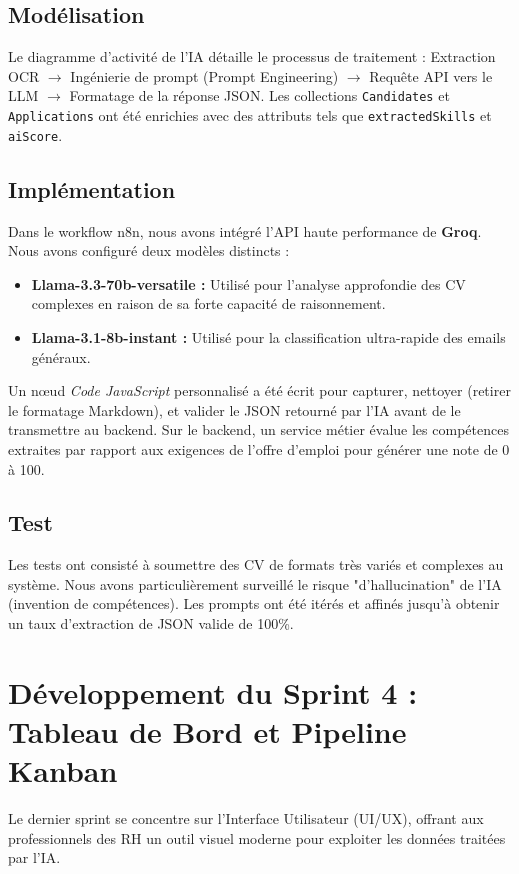 \subsection{Modélisation}
Le diagramme d'activité de l'IA détaille le processus de traitement : Extraction OCR $\rightarrow$ Ingénierie de prompt (Prompt Engineering) $\rightarrow$ Requête API vers le LLM $\rightarrow$ Formatage de la réponse JSON. Les collections \texttt{Candidates} et \texttt{Applications} ont été enrichies avec des attributs tels que \texttt{extractedSkills} et \texttt{aiScore}.

\subsection{Implémentation}
Dans le workflow n8n, nous avons intégré l'API haute performance de \textbf{Groq}. Nous avons configuré deux modèles distincts : 
\begin{itemize}
    \item \textbf{Llama-3.3-70b-versatile :} Utilisé pour l'analyse approfondie des CV complexes en raison de sa forte capacité de raisonnement.
    \item \textbf{Llama-3.1-8b-instant :} Utilisé pour la classification ultra-rapide des emails généraux.
\end{itemize}
Un nœud \textit{Code JavaScript} personnalisé a été écrit pour capturer, nettoyer (retirer le formatage Markdown), et valider le JSON retourné par l'IA avant de le transmettre au backend. Sur le backend, un service métier évalue les compétences extraites par rapport aux exigences de l'offre d'emploi pour générer une note de 0 à 100.

\subsection{Test}
Les tests ont consisté à soumettre des CV de formats très variés et complexes au système. Nous avons particulièrement surveillé le risque "d'hallucination" de l'IA (invention de compétences). Les prompts ont été itérés et affinés jusqu'à obtenir un taux d'extraction de JSON valide de 100\%.

\section{Développement du Sprint 4 : Tableau de Bord et Pipeline Kanban}
Le dernier sprint se concentre sur l'Interface Utilisateur (UI/UX), offrant aux professionnels des RH un outil visuel moderne pour exploiter les données traitées par l'IA.

